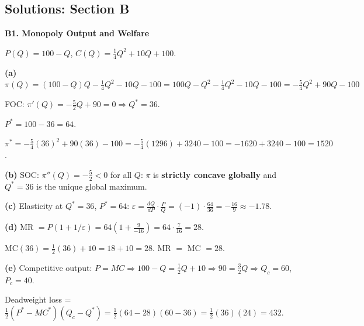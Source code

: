 \documentclass[12pt, a4paper]{article}
\theoremstyle{definition}
\begin{document}
\subsection{Solutions: Section B}

\begin{solbox}
\textbf{B1. Monopoly Output and Welfare}

$P(Q)=100-Q$, \; $C(Q)=\frac{1}{4}Q^2+10Q+100$.

\textbf{(a)} $\pi(Q)=(100-Q)Q-\frac{1}{4}Q^2-10Q-100
= 100Q-Q^2-\frac{1}{4}Q^2-10Q-100
= -\frac{5}{4}Q^2+90Q-100$

FOC: $\pi'(Q)=-\frac{5}{2}Q+90=0\Rightarrow Q^*=36$.

$P^*=100-36=64$.

$\pi^*=-\frac{5}{4}(36)^2+90(36)-100=-\frac{5}{4}(1296)+3240-100
=-1620+3240-100=1520$.

\textbf{(b)} SOC: $\pi''(Q)=-\frac{5}{2}<0$ for all $Q$: $\pi$ is
\textbf{strictly concave globally} and $Q^*=36$ is the unique global maximum.

\textbf{(c)} Elasticity at $Q^*=36$, $P^*=64$:
$\varepsilon = \frac{dQ}{dP}\cdot\frac{P}{Q} = (-1)\cdot\frac{64}{36}
= -\frac{16}{9}\approx -1.78$.

\textbf{(d)} MR $= P(1+1/\varepsilon) = 64(1+\frac{9}{-16}) = 64\cdot\frac{7}{16} = 28$.

MC$(36)=\frac{1}{2}(36)+10=18+10=28$. MR $=$ MC $=28$. \checkmark

\textbf{(e)} Competitive output: $P=MC \Rightarrow 100-Q=\frac{1}{2}Q+10
\Rightarrow 90=\frac{3}{2}Q \Rightarrow Q_c=60$, $P_c=40$.

Deadweight loss = $\frac{1}{2}(P^*-MC^*)(Q_c-Q^*)
= \frac{1}{2}(64-28)(60-36) = \frac{1}{2}(36)(24) = 432$.
\end{solbox}
\end{document}
